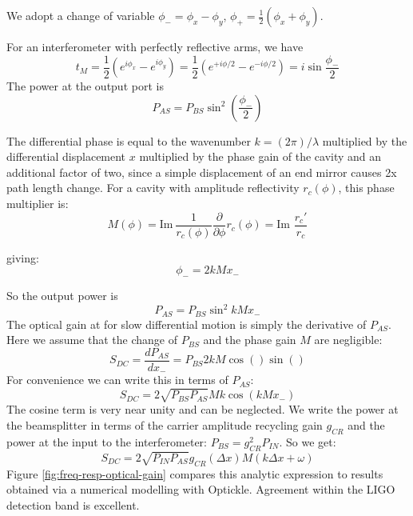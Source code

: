 We adopt a change of variable $\phi_{-}=\phi_{x}-\phi_{y}$, $\phi_{+}=\frac{1}{2}\left(\phi_{x}+\phi_{y}\right)$.

For an interferometer with perfectly reflective arms, we have\begin{equation}
t_{M}=\frac{1}{2}\left(e^{i\phi_{x}}-e^{i\phi_{y}}\right)=\frac{1}{2}\left(e^{+i\phi/2}-e^{-i\phi/2}\right)=i\sin\frac{\phi_{-}}{2}\end{equation}
The power at the output port is \begin{equation}
P_{AS}=P_{BS}\sin^{2}\left(\frac{\phi_{-}}{2}\right)\end{equation}


The differential phase is equal to the wavenumber $k=(2\pi)/\lambda$
multiplied by the differential displacement $x$ multiplied by the
phase gain of the cavity and an additional factor of two, since a
simple displacement of an end mirror causes 2x path length change.
For a cavity with amplitude reflectivity $r_{c}(\phi)$, this phase
multiplier is:\[
M(\phi)=\mathrm{Im\ }\frac{1}{r_{c}(\phi)}\frac{\partial}{\partial\phi}r_{c}(\phi)=\text{Im\ }\frac{r_{c}'}{r_{c}}\]


giving:\[
\phi_{-}=2kMx_{-}\]


So the output power is\begin{equation}
P_{AS}=P_{BS}\sin^{2}kMx_{-}\end{equation}
 The optical gain at for slow differential motion is simply the derivative
of $P_{AS}$. Here we assume that the change of $P_{BS}$ and the
phase gain $M$ are negligible: \begin{equation}
S_{DC}=\frac{dP_{AS}}{dx_{-}}=P_{BS}2kM\cos()\sin()\end{equation}
For convenience we can write this in terms of $P_{AS}$:\begin{equation}
S_{DC}=2\sqrt{P_{BS}P_{AS}}Mk\cos\left(kMx_{-}\right)\end{equation}
The cosine term is very near unity and can be neglected. We write
the power at the beamsplitter in terms of the carrier amplitude recycling
gain $g_{CR}$ and the power at the input to the interferometer: $P_{BS}=g_{CR}^{2}P_{IN}$.
So we get:\begin{equation}
S_{DC}=2\sqrt{P_{IN}P_{AS}}g_{CR}(\Delta x)M(k\Delta x+\omega)\end{equation}
Figure \ref{fig:freq-resp-optical-gain} compares this analytic expression
to results obtained via a numerical modelling with Optickle. Agreement
within the LIGO detection band is excellent.



